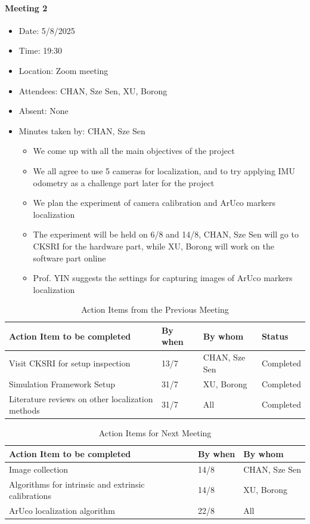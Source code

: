 \documentclass[11pt]{article}
\begin{document}
    \paragraph{Meeting 2}
    \begin{itemize}
        \item Date: 5/8/2025
        \item Time: 19:30
        \item Location: Zoom meeting
        \item Attendees: CHAN, Sze Sen, XU, Borong
        \item Absent: None
        \item Minutes taken by: CHAN, Sze Sen
        \begin{itemize}
            \item We come up with all the main objectives of the project
            \item We all agree to use 5 cameras for localization, and to try applying IMU odometry as a challenge part later for the project
            \item We plan the experiment of camera calibration and ArUco markers localization
            \item The experiment will be held on 6/8 and 14/8, CHAN, Sze Sen will go to CKSRI for the hardware part, while XU, Borong will work on the software part online
            \item Prof. YIN suggests the settings for capturing images of ArUco markers localization
        \end{itemize}
    \end{itemize}
    \begin{longtable}[c]{| l | l | l | l |}
        \caption{Action Items from the Previous Meeting\label{previous meeting 2}}\\ 
        \hline
        \textbf{Action Item to be completed} & \textbf{By when} & \textbf{By whom} & \textbf{Status}\\
        \hline
        Visit CKSRI for setup inspection & 13/7 & CHAN, Sze Sen & Completed\\
        \hline
        Simulation Framework Setup & 31/7 & XU, Borong & Completed\\
        \hline
        Literature reviews on other localization methods & 31/7 & All & Completed\\
        \hline
    \end{longtable}
    \begin{longtable}[c]{| l | l | l |}
        \caption{Action Items for Next Meeting\label{next meeting 2}}\\ 
        \hline
        \textbf{Action Item to be completed} & \textbf{By when} & \textbf{By whom}\\
        \hline
        Image collection & 14/8 & CHAN, Sze Sen\\
        \hline
        Algorithms for intrinsic and extrinsic calibrations & 14/8 & XU, Borong\\
        \hline
        ArUco localization algorithm & 22/8 & All\\
        \hline
    \end{longtable}
\end{document}
